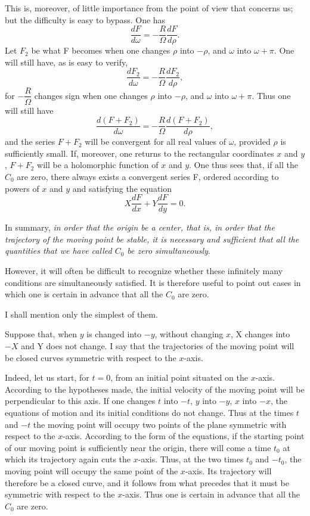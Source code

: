 \documentclass[11pt]{article}
\begin{document}
This is, moreover, of little importance from the point of view that concerns us; but the difficulty is easy to bypass. One has
\[
\frac{dF}{d\omega}=-\frac{R}{\Omega}\frac{dF}{d\rho}.
\]
Let $F_2$ be what F becomes when one changes $\rho$ into $-\rho$, and $\omega$ into $\omega+\pi$. One will still have, as is easy to verify,
\[
\frac{dF_2}{d\omega}=-\frac{R}{\Omega}\frac{dF_2}{d\rho},
\]
for $-\dfrac{R}{\Omega}$ changes sign when one changes $\rho$ into $-\rho$, and $\omega$ into $\omega+\pi$. Thus one will still have
\[
\frac{d(F+F_2)}{d\omega}=-\frac{R}{\Omega}\frac{d(F+F_2)}{d\rho},
\]
and the series $F+F_2$ will be convergent for all real values of $\omega$, provided $\rho$ is sufficiently small. If, moreover, one returns to the rectangular coordinates $x$ and $y$, $F+F_2$ will be a holomorphic function of $x$ and $y$. One thus sees that, if all the $C_0$ are zero, there always exists a convergent series F, ordered according to powers of $x$ and $y$ and satisfying the equation
\[
X\frac{dF}{dx}+Y\frac{dF}{dy}=0.
\]

In summary, \emph{in order that the origin be a center, that is, in order that the trajectory of the moving point be stable, it is necessary and sufficient that all the quantities that we have called $C_0$ be zero simultaneously}.

However, it will often be difficult to recognize whether these infinitely many conditions are simultaneously satisfied. It is therefore useful to point out cases in which one is certain in advance that all the $C_0$ are zero.

I shall mention only the simplest of them.

Suppose that, when $y$ is changed into $-y$, without changing $x$, X changes into $-X$ and Y does not change. I say that the trajectories of the moving point will be closed curves symmetric with respect to the $x$-axis.

Indeed, let us start, for $t=0$, from an initial point situated on the $x$-axis. According to the hypotheses made, the initial velocity of the moving point will be perpendicular to this axis. If one changes $t$ into $-t$, $y$ into $-y$, $x$ into $-x$, the equations of motion and its initial conditions do not change. Thus at the times $t$ and $-t$ the moving point will occupy two points of the plane symmetric with respect to the $x$-axis. According to the form of the equations, if the starting point of our moving point is sufficiently near the origin, there will come a time $t_0$ at which its trajectory again cuts the $x$-axis. Thus, at the two times $t_0$ and $-t_0$, the moving point will occupy the same point of the $x$-axis. Its trajectory will therefore be a closed curve, and it follows from what precedes that it must be symmetric with respect to the $x$-axis. Thus one is certain in advance that all the $C_0$ are zero.
\end{document}
